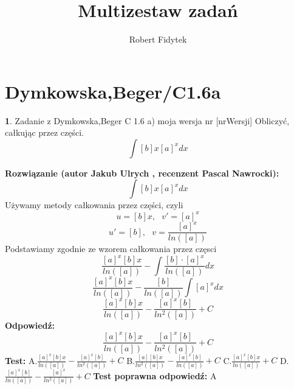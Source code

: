 \documentclass[12pt, a4paper]{article}
\title{Multizestaw zadań}
\author{Robert Fidytek}
\date{}
\theoremstyle{definition} %
\newtheorem{zad}{}
\newcommand{\kategoria}[1]{\section{#1}} %
\newcommand{\zadStart}[1]{\begin{zad}#1\newline} %
\newcommand{\zadStop}{\end{zad}}   %
\newcommand{\rozwStart}[2]{\noindent \textbf{Rozwiązanie (autor #1 , recenzent #2): }\newline} %
\newcommand{\rozwStop}{\newline}                                            %
\newcommand{\odpStart}{\noindent \textbf{Odpowiedź:}\newline}    %
\newcommand{\odpStop}{\newline}                                             %
\newcommand{\testStart}{\noindent \textbf{Test:}\newline} %
\newcommand{\testStop}{\newline} %
\newcommand{\kluczStart}{\noindent \textbf{Test poprawna odpowiedź:}\newline} %
\newcommand{\kluczStop}{\newline} %
\begin{document}
\maketitle


\kategoria{Dymkowska,Beger/C1.6a}
\zadStart{Zadanie z Dymkowska,Beger C 1.6 a) moja wersja nr [nrWersji]}
Obliczyć, całkując przez części.$$\int [b]x[a]^{x}dx$$
\zadStop
\rozwStart{Jakub Ulrych}{Pascal Nawrocki}
$$\int [b]x[a]^{x}dx$$
Używamy metody całkowania przez części, czyli
$$u=[b]x,\text{ }v'=[a]^{x}$$
$$u'=[b],\text{ }v=\frac{[a]^{x}}{ln([a])}$$
Podstawiamy zgodnie ze wzorem całkowania przez częsci
$$\frac{[a]^{x}[b]x}{ln([a])}-\int\frac{[b]\cdot[a]^{x}}{ln([a])}dx$$
$$\frac{[a]^{x}[b]x}{ln([a])}-\frac{[b]}{ln([a])}\int{[a]^{x}}dx$$
$$\frac{[a]^{x}[b]x}{ln([a])}-\frac{[a]^{x}[b]}{ln^{2}([a])}+C$$
\rozwStop
\odpStart
$$\frac{[a]^{x}[b]x}{ln([a])}-\frac{[a]^{x}[b]}{ln^{2}([a])}+C$$
\odpStop
\testStart
A.$\frac{[a]^{x}[b]x}{ln([a])}-\frac{[a]^{x}[b]}{ln^{2}([a])}+C$
B.$\frac{[a][b]x}{ln^{2}([a])}-\frac{[a]^{x}[b]}{ln([a])}+C$
C.$\frac{[a]^{x}[b]x}{ln([a])}+C$
D.$\frac{[a]^{x}[b]}{ln([a])}-\frac{[a]^{x}}{ln^{2}([a])}+C$
\testStop
\kluczStart
A
\kluczStop
\end{document}
